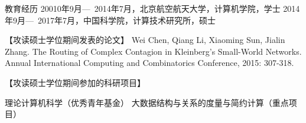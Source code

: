 
\begin{resume}

\begin{resumelist*}{教育经历}
\resumelistitem 20010年9月---~2014年7月，北京航空航天大学，计算机学院，学士
\resumelistitem 2014年9月---~2017年7月，中国科学院，计算技术研究所，硕士
\end{resumelist*}

\begin{resumelist}{【攻读硕士学位期间发表的论文】}
\resumelistitem Wei Chen, Qiang Li, Xiaoming Sun, Jialin Zhang. The Routing of Complex Contagion in Kleinberg's Small-World Networks. Annual International Computing and Combinatorics Conference, 2015: 307-318.
\end{resumelist}

\begin{resumelist}{【攻读硕士学位期间参加的科研项目】}

\resumelistitem 理论计算机科学（优秀青年基金）
\resumelistitem 大数据结构与关系的度量与简约计算（重点项目）

\end{resumelist}

\end{resume}
